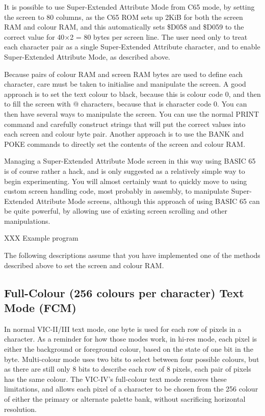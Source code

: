 It is possible to use Super-Extended Attribute Mode from C65 mode, by setting the screen to 80 columns, as the C65 ROM sets up 2KiB for both the screen RAM and colour RAM, and this automatically sets \$D058 and \$D059 to the correct value for 40$\times$2 = 80 bytes per screen line.  The user need only to treat each character pair as a single Super-Extended Attribute character, and to enable Super-Extended Attribute Mode, as described above.

Because pairs of colour RAM and screen RAM bytes are used to define each character, care must be taken to initialise and manipulate the screen.
A good approach is to set the text colour to black, because this is colour code 0, and then to fill the screen with @ characters, because that is
character code 0.  You can then have several ways to manipulate the screen.  You can use the normal PRINT command and carefully construct
strings that will put the correct values into each screen and colour byte pair. Another approach is to use the BANK and POKE commands to directly set the contents of the screen and colour RAM.

Managing a Super-Extended Attribute Mode screen in this way using BASIC 65 is of course rather a hack, and is only suggested as a relatively simple way to begin experimenting.  You will almost certainly want to quickly move to using custom screen handling code, most probably in assembly, to manipulate Super-Extended Attribute Mode screens, although this approach of using BASIC 65 can be quite powerful, by allowing use of existing screen scrolling and other manipulations.

XXX Example program

The following descriptions assume that you have implemented one of the methods described above to set the screen and colour RAM.

\subsection{Full-Colour (256 colours per character) Text Mode (FCM)}

In normal VIC-II/III text mode, one byte is used for each row of pixels in a character.  As a reminder for how those modes work, in
hi-res mode, each pixel is either the background or foreground colour, based on the state of one bit in the byte.  Multi-colour mode
uses two bits to select between four possible colours, but as there are still only 8 bits to describe each row of 8 pixels, each pair
of pixels has the same colour. The VIC-IV's full-colour text mode removes these limitations, and allows each pixel of a character to
be chosen from the 256 colour of either the primary or alternate palette bank, without sacrificing horizontal resolution.

